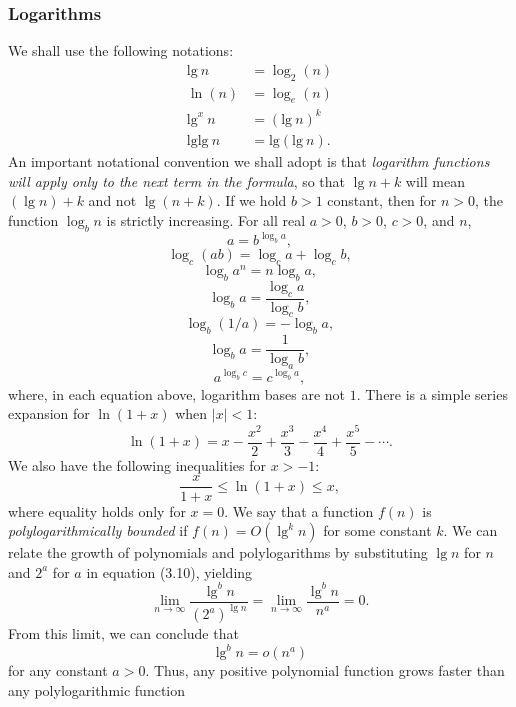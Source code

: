 \documentclass{report}
\begin{document}
        \bigbreak \noindent 
        \subsubsection{Logarithms}
        \bigbreak \noindent 
        We shall use the following notations:
        \begin{align*}
            \text{lg}\ n &= \log_{2}{(n)} \\
            \ln{(n)} &= \log_{e}{(n)} \\
            \text{lg}^{x}\ n &= (\text{lg}\ n)^{k } \\
            \text{lglg}\ n&= \text{lg} (\text{lg}\ n)
        .\end{align*} 
        \bigbreak \noindent 
        An important notational convention we shall adopt is that \textit{logarithm functions will apply only to the next term in the formula}, so that \( \lg n + k \) will mean \( (\lg n) + k \) and not \( \lg(n + k) \). If we hold \( b > 1 \) constant, then for \( n > 0 \), the function \( \log_b n \) is strictly increasing.
        \bigbreak \noindent 
        For all real \( a > 0 \), \( b > 0 \), \( c > 0 \), and \( n \),
        \[
            a = b^{\log_b a} ,
        \]
        \[
            \log_c (ab) = \log_c a + \log_c b ,
        \]
        \[
            \log_b a^n = n \log_b a ,
        \]
        \[
            \log_b a = \frac{\log_c a}{\log_c b} , \tag{3.15}
        \]
        \[
            \log_b (1/a) = - \log_b a ,
        \]
        \[
            \log_b a = \frac{1}{\log_a b} ,
        \]
        \[
            a^{\log_b c} = c^{\log_b a} , \tag{3.16}
        \]
        where, in each equation above, logarithm bases are not \( 1 \).
        \bigbreak \noindent 
        There is a simple series expansion for \( \ln(1 + x) \) when \( |x| < 1 \):
        \[
            \ln(1 + x) = x - \frac{x^2}{2} + \frac{x^3}{3} - \frac{x^4}{4} + \frac{x^5}{5} - \cdots .
        \]
        We also have the following inequalities for \( x > -1 \):
        \[
            \frac{x}{1 + x} \leq \ln(1 + x) \leq x , \tag{3.17}
        \]
        where equality holds only for \( x = 0 \).
        \bigbreak \noindent 
        We say that a function \( f(n) \) is \textit{polylogarithmically bounded} if \( f(n) = O(\lg^k n) \) for some constant \( k \). We can relate the growth of polynomials and polylogarithms by substituting \( \lg n \) for \( n \) and \( 2^a \) for \( a \) in equation (3.10), yielding
        \[
            \lim_{n \to \infty} \frac{\lg^b n}{(2^a)^{\lg n}} = \lim_{n \to \infty} \frac{\lg^b n}{n^a} = 0 .
        \]
        From this limit, we can conclude that
        \[
            \lg^b n = o(n^a)
        \]
        for any constant \( a > 0 \). Thus, any positive polynomial function grows faster than any polylogarithmic function
\end{document}

